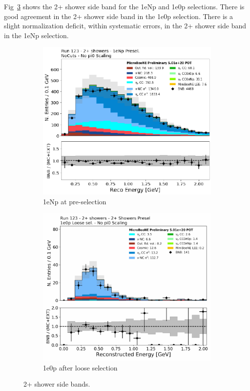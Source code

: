 Fig~\ref{fig:fakedata:set1:2shr} shows the 2+ shower side band for the 1eNp and 1e0p selections. There is good agreement in the 2+ shower side band in the 1e0p selection.  There is a slight normalization deficit, within systematic errors, in the 2+ shower side band in the 1eNp selection. 

\begin{figure}[H] 
\begin{center}
    \begin{subfigure}[b]{0.45\textwidth}
    \centering
    \includegraphics[width=1.00\textwidth]{Fakedata/set1/np_2shr.pdf}
    \caption{\label{fig:fakedata:set1:2shrnp} 1eNp at pre-selection}
    \end{subfigure}
    \begin{subfigure}[b]{0.45\textwidth}
    \centering
    \includegraphics[width=1.00\textwidth]{Fakedata/set1/zp_2shr.pdf}
    \caption{\label{fig:fakedata:set1:2shr0p} 1e0p after loose selection}
    \end{subfigure}
\caption{\label{fig:fakedata:set1:2shr} 2+ shower side bands.}
\end{center}
\end{figure}

